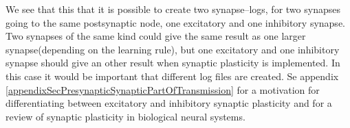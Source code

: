 We see that this that it is possible to create two synapse--logs, for two synapses going to the same postsynaptic node, one excitatory and one inhibitory synapse.
Two synapses of the same kind could give the same result as one larger synapse(depending on the learning rule), but one excitatory and one inhibitory synapse should give an other result when synaptic plasticity is implemented.
In this case it would be important that different log files are created.
Se appendix \ref{appendixSecPresynapticSynapticPartOfTransmission} for a motivation for differentiating between excitatory and inhibitory synaptic plasticity and 
	for a review of synaptic plasticity in biological neural systems.





